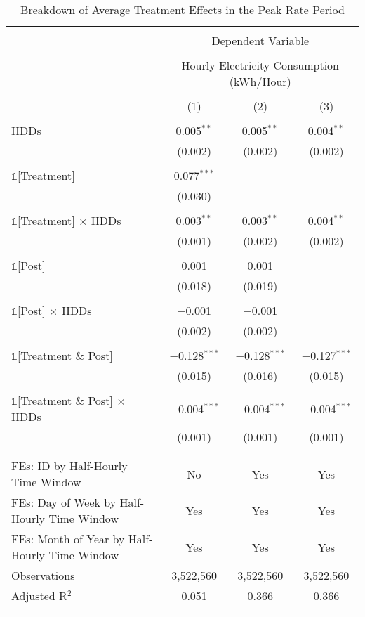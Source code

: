 
\begin{table}[!htbp] \centering 
  \caption{Breakdown of Average Treatment Effects in the Peak Rate Period} 
  \label{Table:Breakdown-of-Average-Treatment-Effects-in-the-Peak-Rate-Period_For-Each-Tariff} 
\small 
\begin{tabular}{@{\extracolsep{20pt}}lccc} 
\\[-1.8ex]\hline 
\hline \\[-1.8ex] 
 & \multicolumn{3}{c}{Dependent Variable} \\ 
\cline{2-4} 
\\[-1.8ex] & \multicolumn{3}{c}{Hourly Electricity Consumption  (kWh/Hour)} \\ 
\\[-1.8ex] & (1) & (2) & (3)\\ 
\hline \\[-1.8ex] 
 HDDs & 0.005$^{**}$ & 0.005$^{**}$ & 0.004$^{**}$ \\ 
  & (0.002) & (0.002) & (0.002) \\ 
  & & & \\ 
 $\mathbb{1}$[Treatment] & 0.077$^{***}$ &  &  \\ 
  & (0.030) &  &  \\ 
  & & & \\ 
 $\mathbb{1}$[Treatment] $\times$ HDDs & 0.003$^{**}$ & 0.003$^{**}$ & 0.004$^{**}$ \\ 
  & (0.001) & (0.002) & (0.002) \\ 
  & & & \\ 
 $\mathbb{1}$[Post] & 0.001 & 0.001 &  \\ 
  & (0.018) & (0.019) &  \\ 
  & & & \\ 
 $\mathbb{1}$[Post] $\times$ HDDs & $-$0.001 & $-$0.001 &  \\ 
  & (0.002) & (0.002) &  \\ 
  & & & \\ 
 $\mathbb{1}$[Treatment \& Post] & $-$0.128$^{***}$ & $-$0.128$^{***}$ & $-$0.127$^{***}$ \\ 
  & (0.015) & (0.016) & (0.015) \\ 
  & & & \\ 
 $\mathbb{1}$[Treatment \& Post] $\times$ HDDs & $-$0.004$^{***}$ & $-$0.004$^{***}$ & $-$0.004$^{***}$ \\ 
  & (0.001) & (0.001) & (0.001) \\ 
  & & & \\ 
\hline \\[-1.8ex] 
FEs: ID by Half-Hourly Time Window & No & Yes & Yes \\ 
FEs: Day of Week by Half-Hourly Time Window & Yes & Yes & Yes \\ 
FEs: Month of Year by Half-Hourly Time Window & Yes & Yes & Yes \\ 
Observations & 3,522,560 & 3,522,560 & 3,522,560 \\ 
Adjusted R$^{2}$ & 0.051 & 0.366 & 0.366 \\ 
\hline 
\hline \\[-1.8ex] 
\end{tabular} 
\end{table} 
